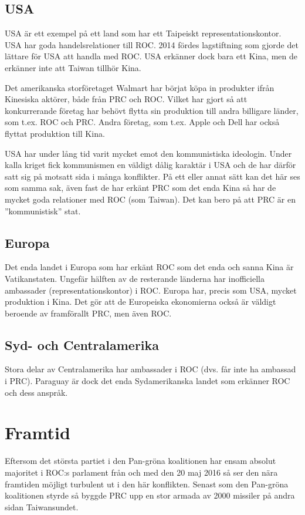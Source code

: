 \documentclass[a4paper,10pt]{article}
\begin{document}
\subsection*{USA}
USA är ett exempel på ett land som har ett Taipeiskt representationskontor. USA har goda handelsrelationer till ROC. 2014 fördes lagstiftning som gjorde det lättare för USA att handla med ROC. USA erkänner dock bara ett Kina, men de erkänner inte att Taiwan tillhör Kina.

Det amerikanska storföretaget Walmart har börjat köpa in produkter ifrån Kinesiska aktörer, både från PRC och ROC. Vilket har gjort så att konkurrerande företag har behövt flytta sin produktion till andra billigare länder, som t.ex. ROC och PRC. Andra företag, som t.ex. Apple och Dell har också flyttat produktion till Kina.

USA har under lång tid varit mycket emot den kommunistiska ideologin. Under kalla kriget fick kommunismen en väldigt dålig karaktär i USA och de har därför satt sig på motsatt sida i många konflikter. På ett eller annat sätt kan det här ses som samma sak, även fast de har erkänt PRC som det enda Kina så har de mycket goda relationer med ROC (som Taiwan). Det kan bero på att PRC är en ''kommunistisk'' stat.

\subsection*{Europa}
Det enda landet i Europa som har erkänt ROC som det enda och sanna Kina är Vatikanstaten. Ungefär hälften av de resterande länderna har inofficiella ambassader (representationskontor) i ROC. Europa har, precis som USA, mycket produktion i Kina. Det gör att de Europeiska ekonomierna också är väldigt beroende av framförallt PRC, men även ROC. 

\subsection*{Syd- och Centralamerika}
Stora delar av Centralamerika har ambassader i ROC (dvs. får inte ha ambassad i PRC). Paraguay är dock det enda Sydamerikanska landet som erkänner ROC och dess anspråk.

\section*{Framtid}
Eftersom det största partiet i den Pan-gröna koalitionen har ensam absolut majoritet i ROC:s parlament från och med den 20 maj 2016 så ser den nära framtiden möjligt turbulent ut i den här konflikten. Senast som den Pan-gröna koalitionen styrde så byggde PRC upp en stor armada av 2000 missiler på andra sidan Taiwansundet.
\end{document}
